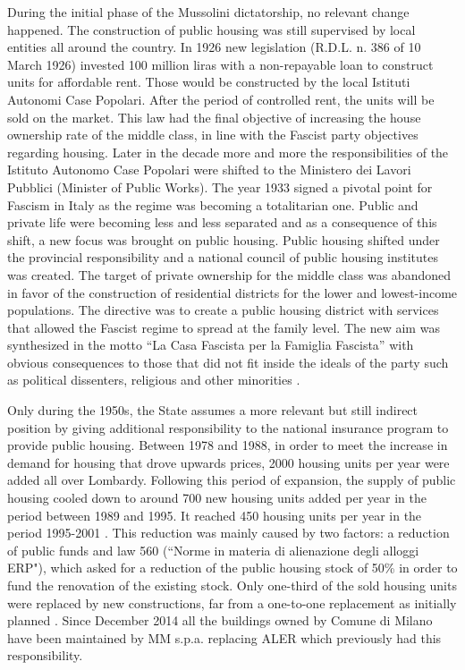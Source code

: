 \documentclass[12pt]{article}
\begin{document}
During the initial phase of the Mussolini dictatorship, no relevant change happened. The construction of public housing was still supervised by local entities all around the country. 	In 1926 new legislation (R.D.L. n. 386 of 10 March 1926) invested 100 million liras with a non-repayable loan to construct units for affordable rent. Those would be constructed by the local Istituti Autonomi Case Popolari. After the period of controlled rent, the units will be sold on the market. This law had the final objective of increasing the house ownership rate of the middle class, in line with the Fascist party objectives regarding housing. Later in the decade more and more the responsibilities of the Istituto Autonomo Case Popolari were shifted to the Ministero dei Lavori Pubblici (Minister of Public Works). The year 1933 signed a pivotal point for Fascism in Italy as the regime was becoming a totalitarian one. Public and private life were becoming less and less separated and as a consequence of this shift, a new focus was brought on public housing. Public housing shifted under the provincial responsibility and a national council of public housing institutes was created. The target of private ownership for the middle class was abandoned in favor of the construction of residential districts for the lower and lowest-income populations. The directive was to create a public housing district with services that allowed the Fascist regime to spread at the family level. The new aim was synthesized in the motto “La Casa Fascista per la Famiglia Fascista” with obvious consequences to those that did not fit inside the ideals of the party such as political dissenters, religious and other minorities \parencite{roberto_ferretti_case_2000}. 


Only during the 1950s, the State assumes a more relevant but still indirect position by giving additional responsibility to the national insurance program to provide public housing. Between 1978 and 1988, in order to meet the increase in demand for housing that drove upwards prices, 2000 housing units per year were added all over Lombardy. Following this period of expansion, the supply of public housing cooled down to around 700 new housing units added per year in the period between 1989 and 1995. It reached 450 housing units per year in the period 1995-2001 \parencite{edilizaaler}. This reduction was mainly caused by two factors: a reduction of public funds and law 560 (``Norme in materia di alienazione degli alloggi ERP"), which asked for a reduction of the public housing stock of 50\% in order to fund the renovation of the existing stock. Only one-third of the sold housing units were replaced by new constructions, far from a one-to-one replacement as initially planned  \parencite{Cognetti}. Since December 2014 all the buildings owned by Comune di Milano have been maintained by MM s.p.a. replacing ALER which previously had this responsibility.
\end{document}
